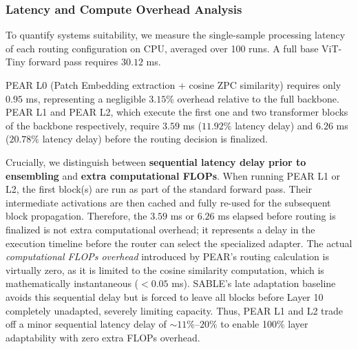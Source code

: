 \subsubsection{Latency and Compute Overhead Analysis}
To quantify systems suitability, we measure the single-sample processing latency of each routing configuration on CPU, averaged over 100 runs. A full base ViT-Tiny forward pass requires $30.12$ ms. 

PEAR L0 (Patch Embedding extraction + cosine ZPC similarity) requires only $0.95$ ms, representing a negligible $\mathbf{3.15\%}$ overhead relative to the full backbone. PEAR L1 and PEAR L2, which execute the first one and two transformer blocks of the backbone respectively, require $3.59$ ms ($\mathbf{11.92\%}$ latency delay) and $6.26$ ms ($\mathbf{20.78\%}$ latency delay) before the routing decision is finalized. 

Crucially, we distinguish between \textbf{sequential latency delay prior to ensembling} and \textbf{extra computational FLOPs}. When running PEAR L1 or L2, the first block(s) are run as part of the standard forward pass. Their intermediate activations are then cached and fully re-used for the subsequent block propagation. Therefore, the $3.59$ ms or $6.26$ ms elapsed before routing is finalized is not extra computational overhead; it represents a delay in the execution timeline before the router can select the specialized adapter. The actual \emph{computational FLOPs overhead} introduced by PEAR's routing calculation is virtually zero, as it is limited to the cosine similarity computation, which is mathematically instantaneous ($<0.05$ ms). SABLE's late adaptation baseline avoids this sequential delay but is forced to leave all blocks before Layer 10 completely unadapted, severely limiting capacity. Thus, PEAR L1 and L2 trade off a minor sequential latency delay of $\sim 11\%$--$20\%$ to enable 100\% layer adaptability with zero extra FLOPs overhead.

